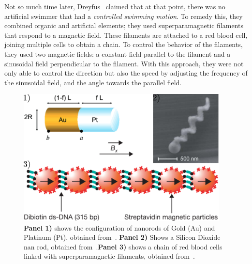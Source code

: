 Not so much time later, Dreyfus~\cite{dreyfus2005microscopic} claimed that at that point, there was no artificial swimmer that had a \textit{controlled swimming motion}. To remedy this, they combined organic and artificial elements; they used superparamagnetic filaments that respond to a magnetic field. These filaments are attached to a red blood cell, joining multiple cells to obtain a chain. To control the behavior of the filaments, they used two magnetic fields: a constant field parallel to the filament and a sinusoidal field perpendicular to the filament. With this approach, they were not only able to control the direction but also the speed by adjusting the frequency of the sinusoidal field, and the angle towards the parallel field.

\begin{figure}
  \begin{center}
    \includegraphics[width=0.95\textwidth]{figures/artificialExamples.pdf}
  \end{center}
  \caption[Artificail microswimmers]{\textbf{Panel 1)} shows the configuration of nanorods of Gold (Au) and Platinum (Pt), obtained from~\cite{paxton2004catalytic}. \textbf{Panel 2)} Shows a Silicon Dioxide nan rod, obtained from~\cite{ghosh2009controlled}.\textbf{Panel 3)} shows a chain of red blood cells linked with superparamagnetic filaments, obtained from~\cite{dreyfus2005microscopic}.}\label{fig:artificialexamples}
\end{figure}



